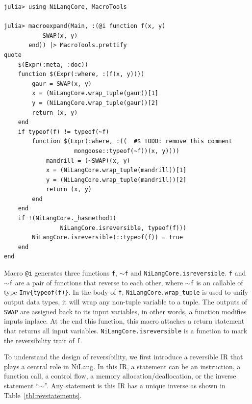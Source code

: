 \documentclass[aps,twocolumn,longbibliography,english,superscriptaddress]{revtex4-1}
\newcommand{\<}{\langle}
\renewcommand{\>}{\rangle}
\newcommand{\Tbl}[1]{Table~\ref{#1}}
\theoremstyle{definition}\newtheorem{definition}{\textit{Definition}}
\begin{document}
\begin{minipage}{.44\textwidth}
\begin{lstlisting}
julia> using NiLangCore, MacroTools

julia> macroexpand(Main, :(@i function f(x, y)
           SWAP(x, y)
       end)) |> MacroTools.prettify
quote
    $(Expr(:meta, :doc))
    function $(Expr(:where, :(f(x, y))))
        gaur = SWAP(x, y)
        x = (NiLangCore.wrap_tuple(gaur))[1]
        y = (NiLangCore.wrap_tuple(gaur))[2]
        return (x, y)
    end
    if typeof(f) != typeof(~f)
        function $(Expr(:where, :((  #$ TODO: remove this comment
                    mongoose::typeof(~f))(x, y))))
            mandrill = (~SWAP)(x, y)
            x = (NiLangCore.wrap_tuple(mandrill))[1]
            y = (NiLangCore.wrap_tuple(mandrill))[2]
            return (x, y)
        end
    end
    if !(NiLangCore._hasmethod1(
                NiLangCore.isreversible, typeof(f)))
        NiLangCore.isreversible(::typeof(f)) = true
    end
end
\end{lstlisting}
\end{minipage}

Macro \texttt{@i} generates three functions \texttt{f}, \texttt{$\sim$f} and \texttt{NiLangCore.isreversible}. \texttt{f} and \texttt{$\sim$f} are a pair of functions that reverse to each other, where \texttt{$\sim$f} is an callable of type \texttt{Inv\{typeof(f)\}}.
In the body of \texttt{f}, \texttt{NiLangCore.wrap\_tuple} is used to unify output data types, it will wrap any non-tuple variable to a tuple.
The outputs of \texttt{SWAP} are assigned back to its input variables, in other words, a function modifies inputs inplace.
At the end this function, this macro attaches a return statement that returns all input variables.
\texttt{NiLangCore.isreversible} is a function to mark the reversibility trait of \texttt{f}.

To understand the design of reversibility, we first introduce a reversible IR that plays a central role in NiLang.
In this IR, a statement can be an instruction, a function call, a control flow, a memory allocation/deallocation, or the inverse statement ``$\sim$''.
Any statement is this IR has a unique inverse as shown in \Tbl{tbl:revstatements}.
\end{document}
